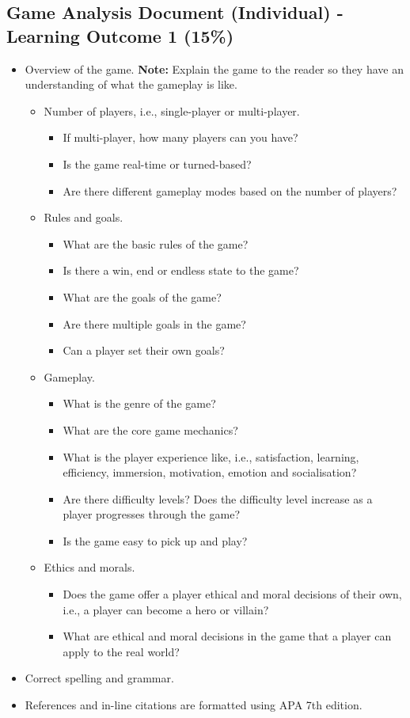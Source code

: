\documentclass{article}
\begin{document}
\subsection*{Game Analysis Document (Individual) - Learning Outcome 1 (15\%)}
\begin{itemize}
	\item Overview of the game. \textbf{Note:} Explain the game to the reader so they have an understanding of what the gameplay is like.
	\begin{itemize}
		\item Number of players, i.e., single-player or multi-player.
		\begin{itemize}
			\item If multi-player, how many players can you have?
			\item Is the game real-time or turned-based?
			\item Are there different gameplay modes based on the number of players?
		\end{itemize}
		\item Rules and goals.
		\begin{itemize}
			\item What are the basic rules of the game?
			\item Is there a win, end or endless state to the game?
			\item What are the goals of the game?
			\item Are there multiple goals in the game?
			\item Can a player set their own goals?
		\end{itemize}
		\item Gameplay.
		\begin{itemize}
			\item What is the genre of the game?
			\item What are the core game mechanics?
			\item What is the player experience like, i.e., satisfaction, learning, efficiency, immersion, motivation,
			emotion and socialisation?
			\item Are there difficulty levels? Does the difficulty level increase as a player progresses through the
			game?
			\item Is the game easy to pick up and play?
		\end{itemize}
		\item Ethics and morals.
		\begin{itemize}
			\item Does the game offer a player ethical and moral decisions of their own, i.e., a player can become a
			hero or villain?
			\item What are ethical and moral decisions in the game that a player can apply to the real world?
		\end{itemize}
	\end{itemize}
	\item Correct spelling and grammar.
	\item References and in-line citations are formatted using APA 7th edition.
\end{itemize}
\end{document}
